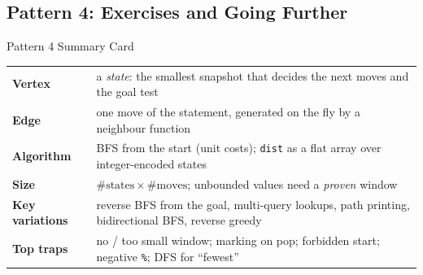 \subsection{Pattern 4: Exercises and Going Further}
\label{ssec:ch1-p4-ex}

\begin{patternbox}{Pattern 4 Summary Card}
\begin{tabularx}{\linewidth}{@{}>{\bfseries}l X@{}}
Vertex & a \emph{state}: the smallest snapshot that decides the next moves and the goal test \\
Edge & one move of the statement, generated on the fly by a neighbour function \\
Algorithm & BFS from the start (unit costs); \texttt{dist} as a flat array over integer-encoded states \\
Size & $\#\text{states}\times\#\text{moves}$; unbounded values need a \emph{proven} window \\
Key variations & reverse BFS from the goal, multi-query lookups, path printing, bidirectional BFS, reverse greedy \\
Top traps & no / too small window; marking on pop; forbidden start; negative \texttt{\%}; DFS for ``fewest'' \\
\end{tabularx}
\end{patternbox}

